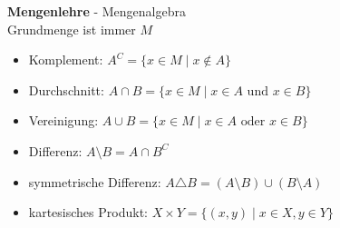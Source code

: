 \documentclass[10pt,landscape,a4paper]{article}
\begin{document}
\begin{multicols*}{4}
\begin{center}
	\normalsize{\textbf{Mengenlehre} - Mengenalgebra} \\
	\scriptsize Grundmenge ist immer $M$
\end{center}
\begin{itemize}
	\item Komplement: $A^C = \{x\in M\mid x\notin A\}$
	\item Durchschnitt: $A\cap B = \{x\in M\mid x\in A \text{ und } x\in B\}$
	\item Vereinigung: $A\cup B = \{x\in M\mid x\in A \text{ oder } x\in B\}$
	\item Differenz: $A\setminus B = A \cap B^C$
	\item symmetrische Differenz: $A\triangle B = (A\setminus B) \cup (B\setminus A)$
	\item kartesisches Produkt: $X\times Y = \{(x,y)\mid x\in X, y\in Y\}$
\end{itemize}


\end{multicols*}
\end{document}
